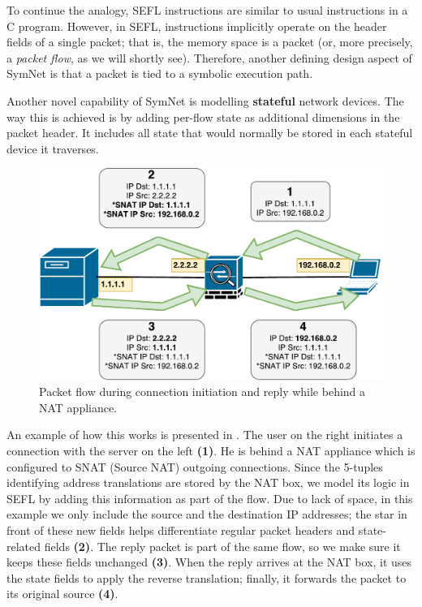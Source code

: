 To continue the analogy, SEFL instructions are similar to usual instructions in
a C program.  However, in SEFL, instructions implicitly operate on the header
fields of a single packet; that is, the memory space is a packet (or, more
precisely, a \emph{packet flow}, as we will shortly see).  Therefore, another
defining design aspect of SymNet is that a packet is tied to a symbolic
execution path.

Another novel capability of SymNet is modelling \textbf{stateful} network
devices.  The way this is achieved is by adding per-flow state as additional
dimensions in the packet header.  It includes all state that would normally be
stored in each stateful device it traverses.

\begin{figure}[h]
  \centering
  \captionsetup{justification=centering}
  \includegraphics[scale=0.6]{assets/img/snat-example}
  \caption{Packet flow during connection initiation and reply while behind a
  NAT appliance.}
  \label{fig:snat-example}
\end{figure}

An example of how this works is presented in
.  The user on the right initiates a
connection with the server on the left \textbf{(1)}.  He is behind a NAT
appliance which is configured to SNAT (Source NAT) outgoing connections.  Since
the 5-tuples identifying address translations are stored by the NAT box, we
model its logic in SEFL by adding this information as part of the flow. Due to
lack of space, in this example we only include the source and the destination
IP addresses; the star in front of these new fields helps differentiate regular
packet headers and state-related fields \textbf{(2)}.  The reply packet is part
of the same flow, so we make sure it keeps these fields unchanged \textbf{(3)}.
When the reply arrives at the NAT box, it uses the state fields to apply the
reverse translation; finally, it forwards the packet to its original source
\textbf{(4)}.

